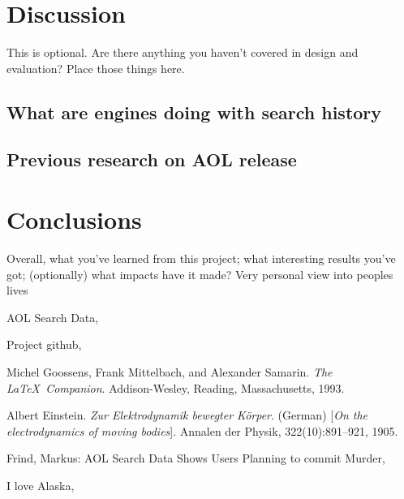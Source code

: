 \documentclass{article}
\begin{document}
\section{Discussion}
This is optional. Are there anything you haven't covered in design and evaluation? Place those things here.

\subsection{What are engines doing with search history}

\subsection{Previous research on AOL release}

\section{Conclusions}
Overall, what you've learned from this project; what interesting results you've got; (optionally) what impacts have it made?
Very personal view into peoples lives

\begin{thebibliography}{9}
AOL Search Data,
\\

Project github,
\\

Michel Goossens, Frank Mittelbach, and Alexander Samarin. 
\textit{The \LaTeX\ Companion}. 
Addison-Wesley, Reading, Massachusetts, 1993.
 
Albert Einstein. 
\textit{Zur Elektrodynamik bewegter K{\"o}rper}. (German) 
[\textit{On the electrodynamics of moving bodies}]. 
Annalen der Physik, 322(10):891–921, 1905.
 
Frind, Markus: AOL Search Data Shows Users Planning to commit Murder,
\\

I love Alaska,
\\


\end{thebibliography}
\end{document}
